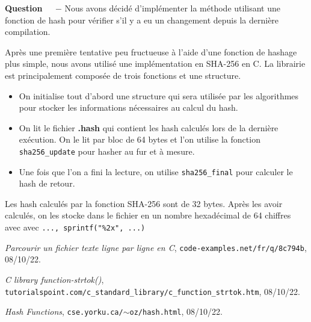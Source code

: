 \documentclass[11pt]{article}
\newcounter{question}[section]
\newenvironment{question}[1][]{\refstepcounter{question}\par\medskip
   \noindent\textbf{Question~\thequestion ~ $-$} \rmfamily}{}
\begin{document}
\begin{question} %
	Nous avons décidé d'implémenter la méthode utilisant une fonction de hash pour vérifier s'il y a eu un changement depuis la dernière compilation.

	Après une première tentative peu fructueuse à l'aide d'une fonction de hashage plus simple, nous avons utilisé %
	une implémentation en SHA-256 en C. La librairie est principalement composée de trois fonctions et une structure.
	\begin{itemize}
		\item On initialise tout d'abord une structure qui sera utilisée par les algorithmes pour stocker les informations nécessaires au calcul du hash.
		\item On lit le fichier \textbf{.hash} qui contient les hash calculés lors de la dernière exécution. On le lit par bloc de 64 bytes et l'on utilise la fonction \texttt{sha256\_update} pour hasher au fur et à mesure.
		\item Une fois que l'on a fini la lecture, on utilise \texttt{sha256\_final} pour calculer le hash de retour.
	\end{itemize}

	Les hash calculés par la fonction SHA-256 sont de 32 bytes. Après les avoir calculés, on les stocke dans le fichier en un nombre hexadécimal de 64 chiffres avec avec \texttt{..., sprintf("\%2x", ...)}

\end{question}



\begin{thebibliography}{99}
  \textit{Parcourir un fichier texte ligne par ligne en C},
  \texttt{code-examples.net/fr/q/8c794b},
  08/10/22.

  \textit{C library function-strtok()},
  \texttt{\\tutorialspoint.com/c\_standard\_library/c\_function\_strtok.htm},
  08/10/22.
  
  \textit{Hash Functions},
  \texttt{cse.yorku.ca/$\sim$oz/hash.html},
  08/10/22.


\end{thebibliography}
\end{document}
